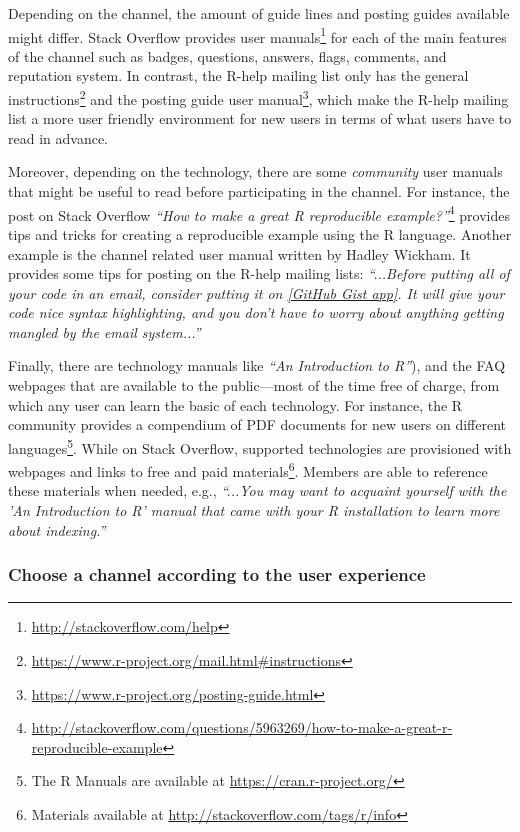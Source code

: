     Depending on the channel, the amount of guide lines and posting guides available might differ. 
    Stack Overflow provides user manuals\footnote{\url{http://stackoverflow.com/help}} for each of the main features of the channel such as badges, questions, answers, flags, comments, and reputation system.
    In contrast, the R-help mailing list only has the general instructions\footnote{\url{https://www.r-project.org/mail.html\#instructions}} and the posting guide user manual\footnote{\url{https://www.r-project.org/posting-guide.html}}, which make the R-help mailing list a more user friendly environment for new users in terms of what users have to read in advance.

    Moreover, depending on the technology, there are some \textit{community} user manuals that might be useful to read before participating in the channel.
    For instance, the post on Stack Overflow \textit{``How to make a great R reproducible example?''}\footnote{\url{http://stackoverflow.com/questions/5963269/how-to-make-a-great-r-reproducible-example}} provides tips and tricks for creating a reproducible example using the R language.
    Another example is the channel related user manual written by Hadley Wickham.
    It provides some tips for posting on the R-help mailing lists: \textit{``...Before putting all of your code in an email, consider putting it on \href{http://gist.github.com/}{[GitHub Gist app]}. It will give your code nice syntax highlighting, and you don't have to worry about anything getting mangled by the email system...''}

    Finally, there are technology manuals like \textit{``An Introduction to R''}), and the FAQ webpages that are available to the public---most of the time free of charge, from which any user can learn the basic of each technology.
    For instance, the R community provides a compendium of PDF documents for new users on different languages\footnote{The R Manuals are available at \url{https://cran.r-project.org/}}.
    While on Stack Overflow, supported technologies are provisioned with webpages and links to free and paid materials\footnote{Materials available at \url{http://stackoverflow.com/tags/r/info}}.
    Members are able to reference these materials when needed, e.g., \textit{``...You may want to acquaint yourself with the 'An Introduction to R' manual that came with your R installation to learn more about indexing.''}

\subsubsection{Choose a channel according to the user experience}
            
